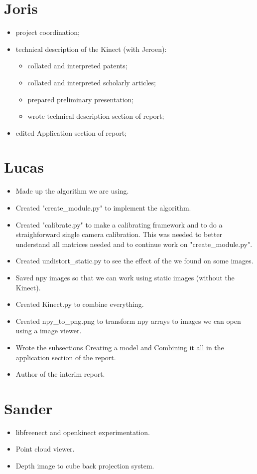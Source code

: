 \section*{Joris}
\begin{itemize}
    \item project coordination;
    \item technical description of the Kinect (with Jeroen):
    \begin{itemize}
        \item collated and interpreted patents;
        \item collated and interpreted scholarly articles;
        \item prepared preliminary presentation;
        \item wrote technical description section of report;
    \end{itemize}
    \item edited Application section of report;
\end{itemize}

\section*{Lucas}
\begin{itemize}
\item Made up the algorithm we are using.
\item Created "create\_module.py" to implement the algorithm.
\item Created "calibrate.py" to make a calibrating framework and to do a 
straighforward single camera calibration. This was needed to better understand 
all matrices needed and to continue work on "create\_module.py".
\item Created undistort\_static.py to see the effect of the we found on some images.
\item Saved npy images so that we can work using static images (without the Kinect).
\item Created Kinect.py to combine everything.
\item Created npy\_to\_png.png to transform npy arrays to images we can open 
using a image viewer.
\item Wrote the subsections Creating a model and Combining it all in the 
application section of the report.
\item Author of the interim report.
\end{itemize}

\section*{Sander}
\begin{itemize}
    \item libfreenect and openkinect experimentation.
    \item Point cloud viewer.
    \item Depth image to cube back projection system.
\end{itemize}
